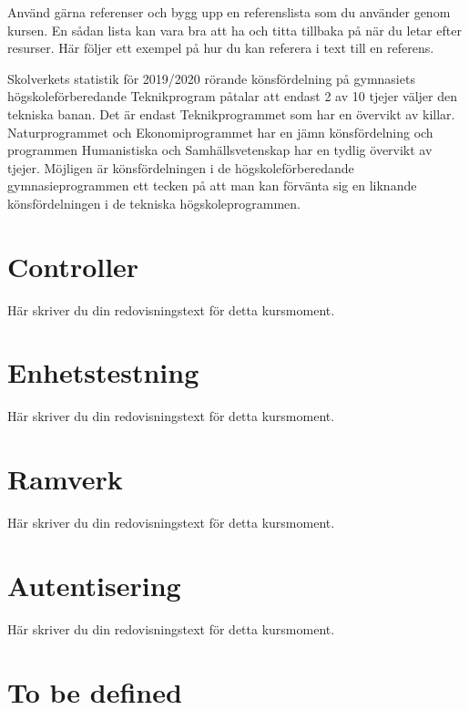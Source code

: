 \documentclass[oneside]{book}
\begin{document}
Använd gärna referenser och bygg upp en referenslista som du använder genom kursen. En sådan lista kan vara bra att ha och titta tillbaka på när du letar efter resurser. Här följer ett exempel på hur du kan referera i text till en referens.

Skolverkets statistik för 2019/2020 \cite{skolverket_2020} rörande könsfördelning på gymnasiets högskoleförberedande Teknikprogram påtalar att endast 2 av 10 tjejer väljer den tekniska banan. Det är endast Teknikprogrammet som har en övervikt av killar. Naturprogrammet och Ekonomiprogrammet har en jämn könsfördelning och programmen Humanistiska och Samhällsvetenskap har en tydlig övervikt av tjejer. Möjligen är könsfördelningen i de högskoleförberedande gymnasieprogrammen ett tecken på att man kan förvänta sig en liknande könsfördelningen i de tekniska högskoleprogrammen.



\chapter{Controller}

Här skriver du din redovisningstext för detta kursmoment.



\chapter{Enhetstestning}

Här skriver du din redovisningstext för detta kursmoment.



\chapter{Ramverk}

Här skriver du din redovisningstext för detta kursmoment.



\chapter{Autentisering}

Här skriver du din redovisningstext för detta kursmoment.



\chapter{To be defined}
\end{document}
